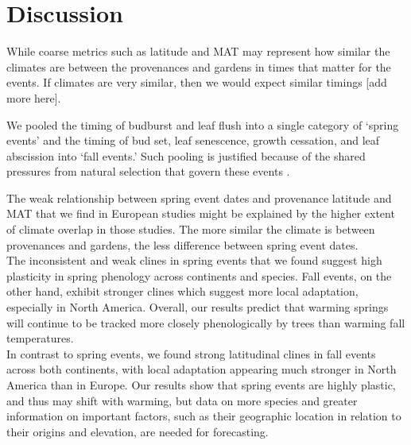 \documentclass{article}
\begin{document}

\section{Discussion}
While coarse metrics such as latitude and MAT may represent how similar the climates are between the provenances and gardens in times that matter for the events. If climates are very similar, then we would expect similar timings [add more here].

We pooled the timing of budburst and leaf flush into a single category of ‘spring events’ and the timing of bud set, leaf senescence, growth cessation, and leaf abscission into ‘fall events.’ Such pooling is justified because of the shared pressures from natural selection that govern these events \citep{Gill15}. 

The weak relationship between spring event dates and provenance latitude and MAT that we find in European studies might be explained by the higher extent of climate overlap in those studies. The more similar the climate is between provenances and gardens, the less difference between spring event dates.
\\

The inconsistent and weak clines in spring events that we found suggest high plasticity in spring phenology across continents and species. Fall events, on the other hand, exhibit stronger clines which suggest more local adaptation, especially in North America. Overall, our results predict that warming springs will continue to be tracked more closely phenologically by trees than warming fall temperatures.
\\

In contrast to spring events, we found strong latitudinal clines in fall events across both continents, with local adaptation appearing much stronger in North America than in Europe. Our results show that spring events are highly plastic, and thus may shift with warming, but data on more species and greater information on important factors, such as their geographic location in relation to their origins and elevation, are needed for forecasting. 
\end{document}
